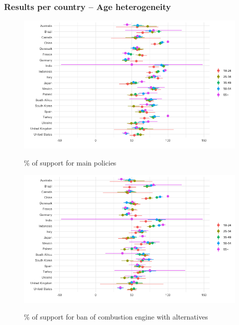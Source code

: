 \subsubsection{Results per country -- Age heterogeneity}

\begin{frame}{}%
\begin{figure}[h!]
\caption{\% of support for main policies} %
\includegraphics[width=.7\paperwidth]{../figures/country_comparison/main_policies_support_age_each_country.png} \\
\end{figure}
\end{frame}

\begin{frame}{}%
\begin{figure}[h!]
\caption{\% of support for ban of combustion engine with alternatives} %
\includegraphics[width=.7\paperwidth]{../figures/country_comparison/standard_public_transport_support_age_each_country.png} \\
\end{figure}
\end{frame}


